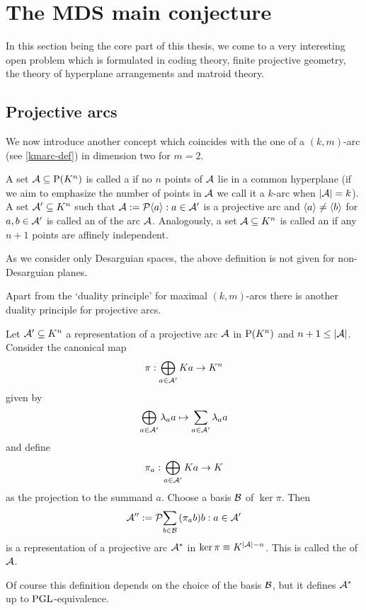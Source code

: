 \section{The MDS main conjecture}

In this section being the core part of this thesis, we come to a very interesting open problem which is formulated in coding theory, finite projective geometry, the theory of hyperplane arrangements and matroid theory.

\subsection{Projective arcs}

We now introduce another concept which coincides with the one of a $(k,m)$-arc (see \autoref{kmarc-def}) in dimension two for $m=2$.

\begin{definition}
    A set $\cA\setleq \P(K^n)$ is called a  if no $n$ points of $\mathcal{A}$ lie in a common hyperplane (if we aim to emphasize the number of points in $\mathcal{A}$ we call it a $k$-arc when $\left|\mathcal{A}\right|=k$).
    A set $\mathcal{A}'\subseteq K^n$ such that $\cA:=\set{\gen a:a\in\cA'}$ is a projective arc and $\gen a\neq\gen b$ for $a,b\in\mathcal{A}'$ is called an  of the arc $\mathcal{A}$.
    Analogously, a set $\mathcal{A}\subseteq K^n$ is called an  if any $n+1$ points are affinely independent.
\end{definition}

\begin{remark}
    As we consider only Desarguian spaces, the above definition is not given for non-Desarguian planes.
\end{remark}

Apart from the `duality principle' for maximal $(k,m)$-arcs there is another duality principle for projective arcs.

\begin{definition}\label{def-dual-arc}
    Let $\mathcal{A}'\subseteq K^n$ a representation of a projective arc $\mathcal{A}$ in $\P(K^n)$ and $n+1\leq \left|\mathcal{A}\right|$. Consider the canonical map
    $$\pi:\bigoplus_{a\in\mathcal{A}'}{Ka}\rightarrow K^n$$
    given by
    $$\bigoplus_{a\in\mathcal{A}'}{\lambda_a a}\mapsto \sum_{a\in\mathcal{A}'}{\lambda_a a}$$
    and define
    $$\pi_a:\bigoplus_{a\in \mathcal{A}'}{Ka}\rightarrow K$$
    as the projection to the summand $a$.
    Choose a basis $\mathcal{B}$ of $\ker \pi$. Then
    $$
    \cA'':=\set{\sum_{b\in\cB}{(\pi_a b)b}:a\in\cA'}
    $$
    is a representation of a projective arc $\mathcal{A}^{\ast}$ in $\ker \pi \iso K^{\card\cA -n}$.
    This is called the  of $\mathcal{A}$.
\end{definition}
\begin{remark}
Of course this definition depends on the choice of the basis $\mathcal{B}$, but it defines $\mathcal{A}^{\ast}$ up to $\mathrm{PGL}$-equivalence.
\end{remark}

